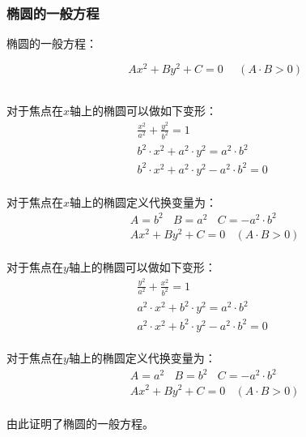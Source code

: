 \documentclass[UTF8]{ctexart}
\begin{document}
\subsubsection{椭圆的一般方程}
    \setcounter{equation}{0}
    椭圆的一般方程：
    \begin{large}
        \begin{equation*}
            ~~~~Ax^2+By^2+C=0~~~~~~(A\cdot B>0)
        \end{equation*}
    \end{large}\\
    对于焦点在$x$轴上的椭圆可以做如下变形：\vspace{3pt}
    \begin{align}
        &\frac{x^2}{a^2}+\frac{y^2}{b^2}=1\\[3mm]
        &b^2\cdot x^2+a^2\cdot y^2=a^2\cdot b^2\\[3mm]
        &b^2\cdot x^2+a^2\cdot y^2-a^2\cdot b^2=0~~~~~~~~~~
    \end{align}\\
    对于焦点在$x$轴上的椭圆定义代换变量为：\vspace{3pt}
    \begin{align}
        &A=b^2~~~~B=a^2~~~~C=-a^2\cdot b^2\\[3mm]
        &Ax^2+By^2+C=0~~~~(A\cdot B>0)
    \end{align}\\
    对于焦点在$y$轴上的椭圆可以做如下变形：\vspace{3pt}
    \begin{align}
        &\frac{y^2}{a^2}+\frac{x^2}{b^2}=1\\[3mm]
        &a^2\cdot x^2+b^2\cdot y^2=a^2\cdot b^2\\[3mm]
        &a^2\cdot x^2+b^2\cdot y^2-a^2\cdot b^2=0~~~~~~~~~~
    \end{align}\\
    对于焦点在$y$轴上的椭圆定义代换变量为：\vspace{3pt}
    \begin{align}
        &A=a^2~~~~B=b^2~~~~C=-a^2\cdot b^2\\[3mm]
        &Ax^2+By^2+C=0~~~~(A\cdot B>0)
    \end{align}\\
    由此证明了椭圆的一般方程。

\newpage
\end{document}

